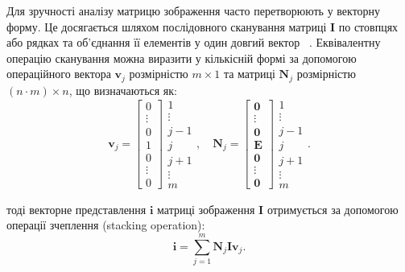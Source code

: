 Для зручності аналізу матрицю зображення часто перетворюють у векторну форму. Це досягається шляхом послідовного сканування матриці $\mathbf{I}$ по стовпцях або рядках та об'єднання її елементів у один довгий вектор ~\cite{pratt2014introduction}. Еквівалентну операцію сканування можна виразити у кількісній формі за допомогою операційного вектора $\mathbf{v}_j$ розмірністю $m \times 1$ та матриці $\mathbf{N}_j$ розмірністю $(n \cdot m) \times n$, що визначаються як:
\begin{equation}
	\mathbf{v}_j = 
	\begin{bmatrix}
		0 \\ \vdots \\ 0 \\ 1 \\ 0 \\ \vdots \\ 0
	\end{bmatrix}
	\begin{matrix}
		1 \\ \vdots \\ j-1 \\ j \\ j+1 \\ \vdots \\ m
	\end{matrix},
	\quad
	\mathbf{N}_j = 
	\begin{bmatrix}
		\mathbf{0} \\ \vdots \\ \mathbf{0} \\ \mathbf{E} \\ \mathbf{0} \\ \vdots \\ \mathbf{0}
	\end{bmatrix}
	\begin{matrix}
		1 \\ \vdots \\ j-1 \\ j \\ j+1 \\ \vdots \\ m
	\end{matrix}.
\end{equation}

тоді векторне представлення $\mathbf{i}$ матриці зображення $\mathbf{I}$ отримується за допомогою операції зчеплення (stacking operation):
\begin{equation}
	\mathbf{i} = \sum_{j=1}^{m} \mathbf{N}_j \mathbf{I} \mathbf{v}_j.
\end{equation}

